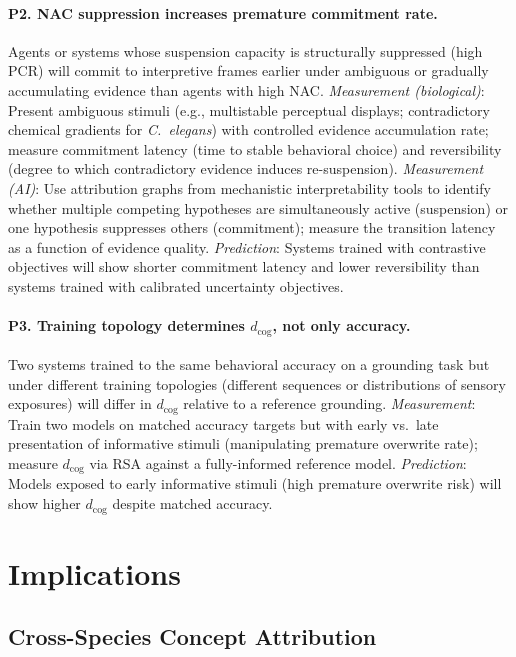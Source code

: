 \documentclass[12pt]{article}
\begin{document}
\paragraph{P2. NAC suppression increases premature commitment rate.}
Agents or systems whose suspension capacity is structurally suppressed
(high PCR) will commit to interpretive frames earlier under ambiguous
or gradually accumulating evidence than agents with high NAC.
\emph{Measurement (biological)}: Present ambiguous stimuli
(e.g., multistable perceptual displays; contradictory chemical gradients
for \textit{C.~elegans}) with controlled evidence accumulation rate;
measure commitment latency (time to stable behavioral choice) and
reversibility (degree to which contradictory evidence induces
re-suspension).
\emph{Measurement (AI)}: Use attribution graphs from mechanistic
interpretability tools \cite{anthropic2025circuit} to identify whether
multiple competing hypotheses are simultaneously active (suspension)
or one hypothesis suppresses others (commitment); measure the transition
latency as a function of evidence quality.
\emph{Prediction}: Systems trained with contrastive objectives will
show shorter commitment latency and lower reversibility than systems
trained with calibrated uncertainty objectives.

\paragraph{P3. Training topology determines $d_\mathrm{cog}$, not only accuracy.}
Two systems trained to the same behavioral accuracy on a grounding task
but under different training topologies (different sequences or
distributions of sensory exposures) will differ in $d_\mathrm{cog}$
relative to a reference grounding.
\emph{Measurement}: Train two models on matched accuracy targets but
with early vs.\ late presentation of informative stimuli (manipulating
premature overwrite rate); measure $d_\mathrm{cog}$ via RSA against a
fully-informed reference model.
\emph{Prediction}: Models exposed to early informative stimuli
(high premature overwrite risk) will show higher $d_\mathrm{cog}$
despite matched accuracy.

\section{Implications}

\subsection{Cross-Species Concept Attribution}
\end{document}
